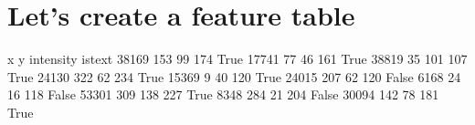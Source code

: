 \documentclass[letterpaper,10pt,english]{sphinxmanual}
\begin{document}
\section{Let’s create a feature table}
\label{\detokenize{05-AdvancedSegmentation:let-s-create-a-feature-table}}
\begin{sphinxVerbatim}[commandchars=\\\{\}]
   \PYG{p}{[}\PYG{p}{]}
           \PYG{p}{[}\PYG{p}{]}
     
                                  
                                 
                                
\end{sphinxVerbatim}

\begin{sphinxVerbatim}[commandchars=\\\{\}]
         x    y  intensity  is\PYGZus{}text
38169  153   99        174     True
17741   77   46        161     True
38819   35  101        107     True
24130  322   62        234     True
15369    9   40        120     True
24015  207   62        120    False
6168    24   16        118    False
53301  309  138        227     True
8348   284   21        204    False
30094  142   78        181     True
\end{sphinxVerbatim}
\end{document}
